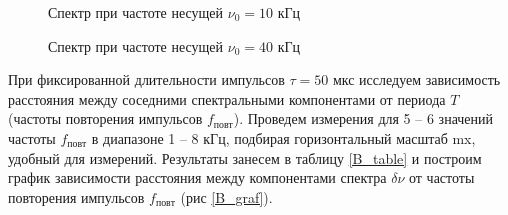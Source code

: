 \documentclass[12pt]{kiarticle}
\begin{document}
  	\begin{figure}[h!]
  		\begin{minipage}[h]{0.5\linewidth}
  			\caption{Спектр при частоте несущей $ \nu_0 = 10 $ кГц}
  			\label{B_10}
  		\end{minipage}
  		\begin{minipage}[h]{0.5\linewidth}
  			\caption{Спектр при частоте несущей $ \nu_0 = 40 $ кГц}
  			\label{B_40}
  		\end{minipage}
  	\end{figure}
  	
  	При фиксированной длительности импульсов  $ \tau = 50 $ мкс исследуем зависимость расстояния между соседними спектральными компонентами
  	от периода $ T $ (частоты повторения импульсов $ f_{повт} $). Проведем измерения для 5 -- 6 значений частоты $ f_{повт} $ в диапазоне 1 -- 8 кГц, подбирая горизонтальный масштаб mx, удобный для измерений. Результаты занесем в таблицу \ref{B_table} и построим график зависимости расстояния между компонентами спектра $ \delta \nu $ от частоты повторения импульсов $ f_{повт} $ (рис \ref{B_graf}). 
  
\end{document}

